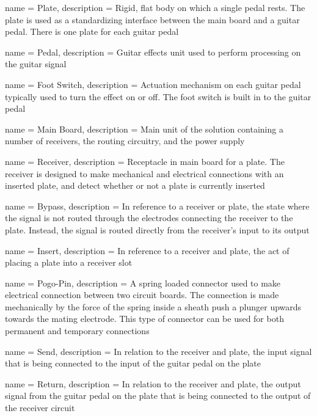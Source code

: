  {
	name = Plate,
	description = {Rigid, flat body on which a single pedal rests.  The plate is used as a standardizing interface between the main board and a guitar pedal.  There is one plate for each guitar pedal}
}

 {
	name = Pedal,
	description = {Guitar effects unit used to perform processing on the guitar signal}
}

 {
	name = {Foot Switch},
	description = {Actuation mechanism on each guitar pedal typically used to turn the effect on or off.  The foot switch is built in to the guitar pedal}
}

 {
	name = {Main Board},
	description = {Main unit of the solution containing a number of receivers, the routing circuitry, and the power supply}
}

 {
	name = {Receiver},
	description = {Receptacle in main board for a plate.  The receiver is designed to make mechanical and electrical connections with an inserted plate, and detect whether or not a plate is currently inserted}
}

 {
	name = {Bypass},
	description = {In reference to a receiver or plate, the state where the signal is not routed through the electrodes connecting the receiver to the plate.  Instead, the signal is routed directly from the receiver's input to its output}
}

 {
	name = {Insert},
	description = {In reference to a receiver and plate, the act of placing a plate into a receiver slot}
}

 {
	name = {Pogo-Pin}, 
	description = {A spring loaded connector used to make electrical connection between two circuit boards.  The connection is made mechanically by the force of the spring inside a sheath push a plunger upwards towards the mating electrode.  This type of connector can be used for both permanent and temporary connections}
}

 {
	name = {Send},
	description = {In relation to the receiver and plate, the input signal that is being connected to the input of the guitar pedal on the plate}
}

 {
	name = {Return},
	description = {In relation to the receiver and plate, the output signal from the guitar pedal on the plate that is being connected to the output of the receiver circuit}
}